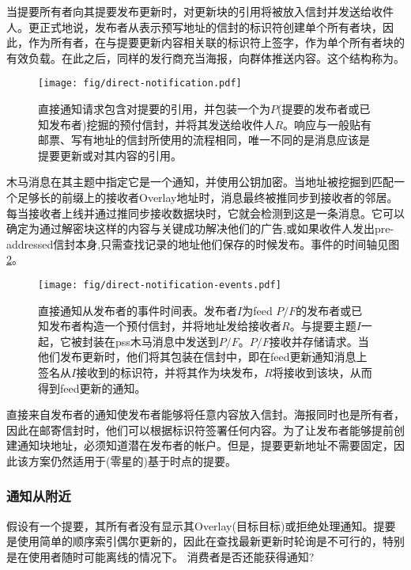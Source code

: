 当提要所有者向其提要发布更新时，对更新块的引用将被放入信封并发送给收件人。更正式地说，发布者从表示预写地址的信封的标识符创建单个所有者块，因此，作为所有者，在与提要更新内容相关联的标识符上签字，作为单个所有者块的有效负载。在此之后，同样的发行商充当海报，向群体推送内容。这个结构称为。 

\begin{figure}[htbp]
   \centering
   \texttt{[image: fig/direct-notification.pdf]}
   \caption[直接通知请求和响应\statusgreen]{直接通知请求包含对提要的引用，并包装一个为$P$(提要的发布者或已知发布者)挖掘的预付信封，并将其发送给收件人$R$。响应与一般贴有邮票、写有地址的信封所使用的流程相同，唯一不同的是消息应该是提要更新或对其内容的引用。}
   \label{fig:direct-notification}
\end{figure}

木马消息在其主题中指定它是一个通知，并使用公钥加密。当地址被挖掘到匹配一个足够长的前缀上的接收者Overlay地址时，消息最终被推同步到接收者的邻居。每当接收者上线并通过推同步接收数据块时，它就会检测到这是一条消息。它可以确定为通过解密块这样的内容与关键成功解决他们的广告,或如果收件人发出pre-addressed信封本身,只需查找记录的地址他们保存的时候发布。事件的时间轴见图\ref{fig:direct-notification-events}。


\begin{figure}[htbp]
   \centering
    \texttt{[image: fig/direct-notification-events.pdf]}
   \caption[直接通知从发布者的事件时间表\statusgreen]{直接通知从发布者的事件时间表。发布者$I$为feed $P/F$的发布者或已知发布者构造一个预付信封，并将地址发给接收者$R$。与提要主题$I$一起，它被封装在pss木马消息中发送到$P/F$。$P/F$接收并存储请求。当他们发布更新时，他们将其包装在信封中，即在feed更新通知消息上签名从$I$接收到的标识符，并将其作为块发布，$R$将接收到该块，从而得到feed更新的通知。 }
   \label{fig:direct-notification-events}
\end{figure}


直接来自发布者的通知使发布者能够将任意内容放入信封。海报同时也是所有者，因此在邮寄信封时，他们可以根据标识符签署任何内容。为了让发布者能够提前创建通知块地址，必须知道潜在发布者的帐户。但是，提要更新地址不需要固定，因此该方案仍然适用于(零星的)基于时点的提要。

\subsubsection{通知从附近}

假设有一个提要，其所有者没有显示其Overlay(目标目标)或拒绝处理通知。提要是使用简单的顺序索引偶尔更新的，因此在查找最新更新时轮询是不可行的，特别是在使用者随时可能离线的情况下。
消费者是否还能获得通知?


